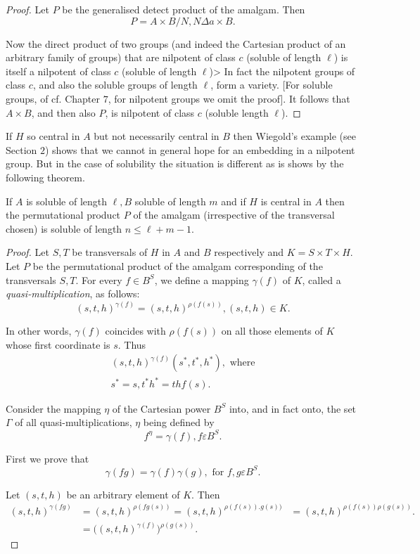 \begin{proof}
  Let $P$ be the generalised detect product of the amalgam. Then
  $$
  P=A \times B/N,N \Delta a \times B.
  $$

  Now the direct product of two groups (and indeed the Cartesian
  product of an arbitrary family of groups) that are nilpotent of
  class $c$ (soluble of length $\ell$) is itself a nilpotent of class
  $c$ (soluble of length $\ell$)> In fact the nilpotent groups of
  class $c$, and also the soluble groups of length $\ell$, form a
  variety. [For soluble groups, of cf. Chapter $7$, for nilpotent
    groups we omit the proof]. It follows that $A \times B$, and then
  also $P$, is nilpotent of class $c$ (soluble length $\ell$). 
\end{proof}

If $H$ so central in $A$ but not necessarily central in $B$ then
Wiegold's example (see Section $2$) shows that we cannot in general
hope for an embedding in a nilpotent group. But in the case of
solubility the situation is different as is shows by the following
theorem. 

\begin{Theorem}%
  If $A$ is soluble of length $\ell,B$ soluble of length $m$ and if
  $H$ is central in $A$ then the permutational product $P$ of the
  amalgam (irrespective of the transversal chosen) is soluble of
  length $n \leq \ell+ m-1$. 
\end{Theorem}

\begin{proof}
  Let $S,T$ be transversals of $H$ in $A$ and $B$ respectively and
  $K=S \times T \times H$. Let $P$ be the permutational product of the
  amalgam corresponding of the transversals $S,T$. For every $f \in
  B^S$, we define a mapping $\gamma (f)$ of $K$, called a {\em
    quasi-multiplication}, as follows: 
  $$
  (s,t,h)^{\gamma(f)}=(s,t,h)^{\rho(f(s))},(s,t,h)\in K.
  $$

  In other words, $\gamma (f)$ coincides with $\rho (f(s))$ on all
  those elements of $K$ whose first coordinate is $s$. Thus  
  \begin{gather*}
    (s,t,h)^{\gamma(f)}(s^*,t^*,h^*), \text{ where}\\
    s^*=s,t^*h^*=thf(s).
  \end{gather*}

  Consider the mapping $\eta$ of the Cartesian power $B^S$ into, and
  in fact onto, the set $\Gamma$ of all quasi-multiplications, $\eta$
  being defined by 
  $$
  f^ \eta= \gamma(f),f \varepsilon B^S.
  $$

  First we prove that
  $$
  \gamma (fg)=\gamma (f) \gamma(g), \text{ for } f,g \varepsilon B^S.
  $$

  Let $(s,t,h)$ be an arbitrary element of $K$. Then
  \begin{align*}
    (s,t,h)^{\gamma(fg)} &=(s,t,h)^{\rho(fg(s))}= (s,t,h)^{\rho(f(s)).g(s))}
    &= (s,t,h)^{\rho (f(s)) \rho(g(s))}. \\
    &= \bigg ( (s,t,h)^{\gamma(f)} \bigg) ^{\rho(g(s))}.
  \end{align*}
\end{proof}


